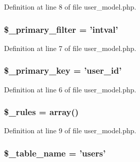 Definition at line 8 of file user\-\_\-model.\-php.

\hypertarget{class_user__model_a46d38cf0c97ee3e0a37dee799457bd14}{
\subsubsection[{\$\-\_\-primary\-\_\-filter}]{\setlength{\rightskip}{0pt plus 5cm}\$\-\_\-primary\-\_\-filter = 'intval'\hspace{0.3cm}{\ttfamily [protected]}}}\label{class_user__model_a46d38cf0c97ee3e0a37dee799457bd14}


Definition at line 7 of file user\-\_\-model.\-php.

\hypertarget{class_user__model_a1befeb0c72587cd2574cd7d1818d66b8}{
\subsubsection[{\$\-\_\-primary\-\_\-key}]{\setlength{\rightskip}{0pt plus 5cm}\$\-\_\-primary\-\_\-key = 'user\-\_\-id'\hspace{0.3cm}{\ttfamily [protected]}}}\label{class_user__model_a1befeb0c72587cd2574cd7d1818d66b8}


Definition at line 6 of file user\-\_\-model.\-php.

\hypertarget{class_user__model_a2432b65e7e8b8a8328a1c47ab6ca0409}{
\subsubsection[{\$\-\_\-rules}]{\setlength{\rightskip}{0pt plus 5cm}\$\-\_\-rules = array()\hspace{0.3cm}{\ttfamily [protected]}}}\label{class_user__model_a2432b65e7e8b8a8328a1c47ab6ca0409}


Definition at line 9 of file user\-\_\-model.\-php.

\hypertarget{class_user__model_a90ebc25e748e2696e00b5c5cf3255ee4}{
\subsubsection[{\$\-\_\-table\-\_\-name}]{\setlength{\rightskip}{0pt plus 5cm}\$\-\_\-table\-\_\-name = 'users'\hspace{0.3cm}{\ttfamily [protected]}}}\label{class_user__model_a90ebc25e748e2696e00b5c5cf3255ee4}


